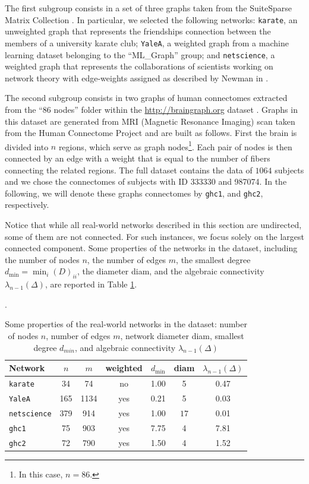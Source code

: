 \documentclass[a4paper,12pt]{article}
\begin{document}
The first subgroup consists in a set of three graphs taken from the SuiteSparse Matrix Collection \cite{SuiteSparse}. In particular, we selected the following networks: \texttt{karate}, an unweighted graph that represents the friendships connection between the members of a university karate club; \texttt{YaleA}, a weighted graph from a machine learning dataset belonging to the ``ML\_Graph'' group; and \texttt{netscience}, a weighted graph that represents the collaborations of scientists working on network theory with edge-weights assigned as described by Newman in \cite{Newman2000ScientificCN}.

The second subgroup consists in two graphs of human connectomes extracted from the ``86 nodes'' folder within the \url{http://braingraph.org} dataset \cite{braingraph}. Graphs in this dataset are generated from MRI (Magnetic Resonance Imaging) scan taken from the Human Connectome Project \cite{Human_connectone} and are built as follows. First the brain is divided into $n$ regions, which serve as graph nodes\footnote{In this case, $n=86$.}. 
Each pair of nodes is then connected by an edge with a weight that is equal to the number of fibers connecting the related regions. The full dataset contains the data of $1064$ subjects and we chose the connectomes of subjects with ID 333330 
and 987074. In the following, we will denote these graphs connectomes by \texttt{ghc1},  
and \texttt{ghc2}, respectively.

Notice that while all real-world networks described in this section are undirected, some of them are not connected. For such instances, we focus solely on the largest connected component. 
Some properties of the networks in the dataset, including the number of nodes $n$, the number of edges $m$, the smallest degree $d_{\min}=\min_{i} (D)_{ii}$, the diameter diam, and the algebraic connectivity $\lambda_{n-1}(\Delta)$, are reported in Table \ref{tab:real_networks_info}. 

\begin{table}[t]
    \centering
    \caption{Some properties of the real-world networks in the dataset: number of nodes $n$, number of edges $m$, network diameter diam, smallest degree $d_{min}$, and  algebraic connectivity $\lambda_{n-1}(\Delta)$}.
    \begin{tabular}{lcccccc}       
		\toprule
		Network & $n$ & $m$ & weighted & $d_{\min}$ & diam & $\lambda_{n-1}(\Delta)$ \\
		\midrule
                  
        \texttt{karate}  & 34 & 74 & no &  1.00  & 5 & 0.47  \\
       \texttt{YaleA} &  165  & 1134 & yes & 0.21  & 5 &  0.03 \\
       \texttt{netscience}  & 379 & 914 & yes & 1.00 & $17$ &    0.01 \\
       \texttt{ghc1} &     75  &  903  &  yes &   7.75 &   4 &      7.81    \\
       \texttt{ghc2} & 72  &  790  & yes &   1.50  & 4  &   1.52  \\

        \bottomrule
    \end{tabular}   
    \label{tab:real_networks_info}
\end{table}
\end{document}
